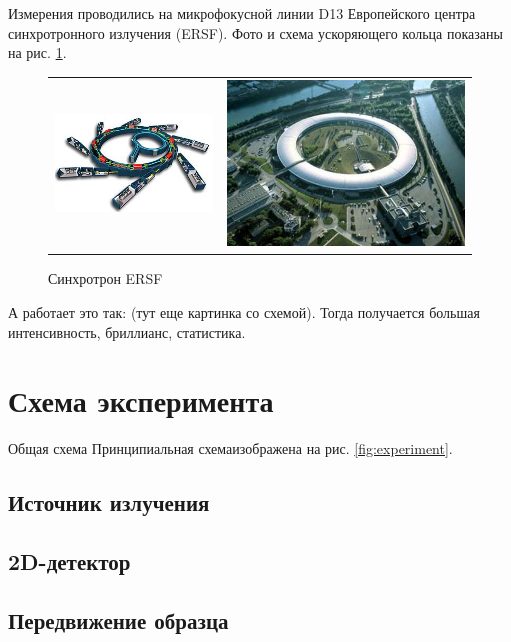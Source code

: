Измерения проводились на микрофокусной линии D13 Европейского центра синхротронного излучения (ERSF). Фото и схема ускоряющего кольца показаны на рис. \ref{fig:ring}. 
	
	
		\begin{figure}[h]\center
\begin{tabular}{cc}
\includegraphics[width=0.5\linewidth]{fig/pribor-scheme.jpg}
&
\includegraphics[width=0.5\linewidth]{fig/pribor-photo.jpg}
\end{tabular}
\caption{Синхротрон ERSF}
\label{fig:ring}
\end{figure}
	
А работает это так:
(тут еще картинка со схемой). Тогда получается большая интенсивность, бриллианс, статистика.



\section{Схема эксперимента}
Общая схема
Принципиальная схемаизображена на рис. \ref{fig:experiment}. 

\subsection{Источник излучения}


\subsection{2D-детектор}

\subsection{Передвижение образца}


